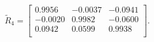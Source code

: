 \begin{equation*}
\widetilde{R}_{4} = 
\begin{bmatrix}
  0.9956 &  -0.0037 &  -0.0941 \\
 -0.0020 &   0.9982 &  -0.0600 \\
  0.0942 &   0.0599 &   0.9938 \\
\end{bmatrix}.
\end{equation*}

